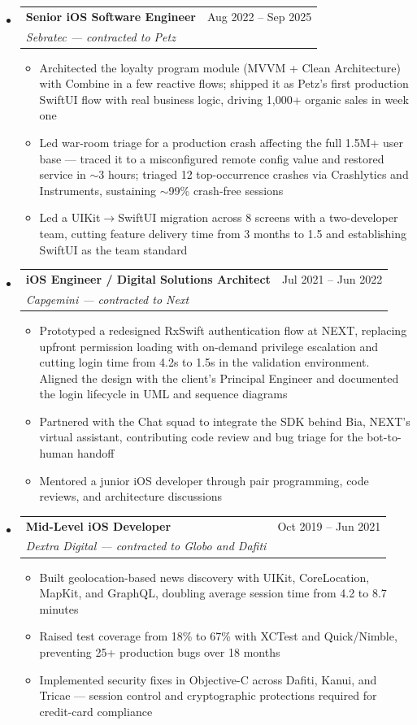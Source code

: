 \documentclass[11pt,letterpaper]{article}
\makeatletter
\newcommand{\resumeSubheading}[4]{
  \item
    \begin{tabular*}{\linewidth}{l@{\extracolsep{\fill}}r}
      \textbf{#1} & #2 \\
      \textit{#3} & \textit{#4} \\
    \end{tabular*}
}
\newcommand{\resumeItem}[1]{
  \item{#1}
}
\makeatother
\begin{document}
\begin{itemize}[leftmargin=0.15in, label={}]
    \resumeSubheading
        {Senior iOS Software Engineer}{Aug 2022 -- Sep 2025}
        {Sebratec --- contracted to Petz}{}
        \begin{itemize}
            \resumeItem{Architected the loyalty program module (MVVM + Clean Architecture) with Combine in a few reactive flows; shipped it as Petz's first production SwiftUI flow with real business logic, driving 1,000+ organic sales in week one}
            \resumeItem{Led war-room triage for a production crash affecting the full 1.5M+ user base --- traced it to a misconfigured remote config value and restored service in $\sim$3 hours; triaged 12 top-occurrence crashes via Crashlytics and Instruments, sustaining $\sim$99\% crash-free sessions}
            \resumeItem{Led a UIKit$\rightarrow$SwiftUI migration across 8 screens with a two-developer team, cutting feature delivery time from 3 months to 1.5 and establishing SwiftUI as the team standard}
        \end{itemize}

    \resumeSubheading
        {iOS Engineer / Digital Solutions Architect}{Jul 2021 -- Jun 2022}
        {Capgemini --- contracted to Next}{}
        \begin{itemize}
            \resumeItem{Prototyped a redesigned RxSwift authentication flow at NEXT, replacing upfront permission loading with on-demand privilege escalation and cutting login time from 4.2s to 1.5s in the validation environment. Aligned the design with the client's Principal Engineer and documented the login lifecycle in UML and sequence diagrams}
            \resumeItem{Partnered with the Chat squad to integrate the SDK behind Bia, NEXT's virtual assistant, contributing code review and bug triage for the bot-to-human handoff}
            \resumeItem{Mentored a junior iOS developer through pair programming, code reviews, and architecture discussions}
        \end{itemize}

    \resumeSubheading
        {Mid-Level iOS Developer}{Oct 2019 -- Jun 2021}
        {Dextra Digital --- contracted to Globo and Dafiti}{}
        \begin{itemize}
            \resumeItem{Built geolocation-based news discovery with UIKit, CoreLocation, MapKit, and GraphQL, doubling average session time from 4.2 to 8.7 minutes}
            \resumeItem{Raised test coverage from 18\% to 67\% with XCTest and Quick/Nimble, preventing 25+ production bugs over 18 months}
            \resumeItem{Implemented security fixes in Objective-C across Dafiti, Kanui, and Tricae --- session control and cryptographic protections required for credit-card compliance}
        \end{itemize}


\end{itemize}
\end{document}

